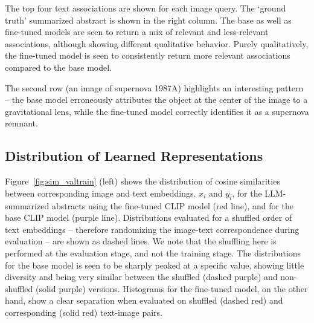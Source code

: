 \documentclass[10pt]{article} %
\begin{document}
The top four text associations are shown for each image query.
%
The `ground truth' summarized abstract is shown in the right column.
% 
The base as well as fine-tuned models are seen to return a mix of relevant and less-relevant associations, although showing different qualitative behavior. Purely qualitatively, the fine-tuned model is seen to consistently return more relevant associations compared to the base model.
%

The second row (an image of supernova 1987A) highlights an interesting pattern -- the base model erroneously attributes the object at the center of the image to a gravitational lens, while the fine-tuned model correctly identifies it as a supernova remnant.

\subsection{Distribution of Learned Representations}

Figure~\ref{fig:sim_valtrain} (left) shows the distribution of cosine similarities between corresponding image and text embeddings, $x_i$ and $y_i$, for the LLM-summarized abstracts using the fine-tuned CLIP model (red line), and for the base CLIP model (purple line).
%
Distributions evaluated for a shuffled order of text embeddings -- therefore randomizing the image-text correspondence during evaluation -- are shown as dashed lines. We note that the shuffling here is performed at the evaluation stage, and not the training stage.
%
The distributions for the base model is seen to be sharply peaked at a specific value, showing little diversity and being very similar between the shuffled (dashed purple) and non-shuffled (solid purple) versions. 
%
Histograms for the fine-tuned model, on the other hand, show a clear separation when evaluated on shuffled (dashed red) and corresponding (solid red) text-image pairs.

\end{document}
